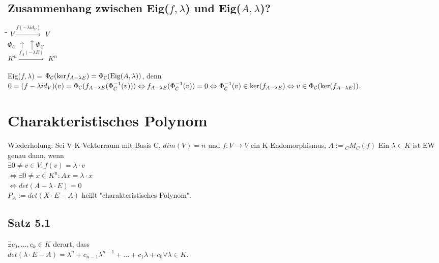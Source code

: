 \documentclass[a4paper, 12pt]{extarticle}
\newcommand{\tn}[1]{\textnormal {#1}}
\begin{document}
\subsection*{Zusammenhang zwischen Eig($f, \lambda$) und Eig($A, \lambda$)?}
\begin{tabbing}
	\hspace{15pt}\=\hspace{65pt}\=\hspace{2cm}\= \kill
	\>$V \xrightarrow{f (- \lambda id_V)}$ \>$V$\\
	$\Phi{_\mathcal C}$ \>$\uparrow$ \>$\uparrow \Phi_\mathcal C$\\
	\>$K^n \xrightarrow{f_A (- \lambda E)}$ \>$K^n$
\end{tabbing}
Eig($f, \lambda$) = $\Phi_\mathcal C(\tn{ker} f_{A-\lambda E}) = \Phi_\mathcal C(\tn{Eig}(A, \lambda))$, denn \\$0 = (f-\lambda id_V)(v) = \Phi_\mathcal C(f_{A-\lambda E}(\Phi_{\mathcal C}^{-1}(v))) \Leftrightarrow f_{A-\lambda E}(\Phi_{\mathcal C}^{-1}(v)) = 0 \Leftrightarrow \Phi_{\mathcal C}^{-1}(v) \in \tn{ker}(f_{A-\lambda E}) \Leftrightarrow v \in \Phi_{\mathcal C}(\tn{ker}(f_{A-\lambda E}))$.
\section{Charakteristisches Polynom}
Wiederholung: Sei V K-Vektorraum mit Basis C, $dim(V) = n$ und $f : V \rightarrow V$ ein K-Endomorphismus, $A := {}_{C}M_C(f)$ Ein $\lambda \in K$ ist EW genau dann, wenn \\
$\exists 0 \neq v \in V : f(v) = \lambda \cdot v$\\
$\Leftrightarrow \exists 0 \neq x \in K^n: Ax = \lambda \cdot x$\\
$\Leftrightarrow det(A-\lambda \cdot E) = 0$\\
$P_A := det(X\cdot E - A)$ heißt "charakteristisches Polynom".

\subsection*{Satz 5.1}
$\exists c_0, ... , c_k \in K$ derart, dass \\
$det(\lambda \cdot E - A) = \lambda^n + c_{n-1}\lambda^{n-1} + ... + c_1\lambda + c_0 \forall \lambda \in K.$\\
\end{document}
